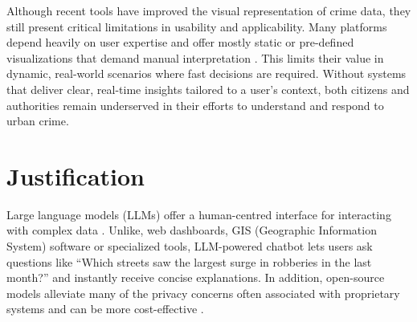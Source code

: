 Although recent tools have improved the visual representation of crime data, they still present critical limitations in usability and applicability. Many platforms depend heavily on user expertise and offer mostly static or pre-defined visualizations that demand manual interpretation \citep{Garcia2022CriPAV}. This limits their value in dynamic, real-world scenarios where fast decisions are required. Without systems that deliver clear, real-time insights tailored to a user's context, both citizens and authorities remain underserved in their efforts to understand and respond to urban crime.




\section{Justification}



Large language models (LLMs) offer a human-centred interface for interacting with complex data \citep{Yang2024HumanAIInteraction, Pappula2023LLMsFC}. Unlike, web dashboards, GIS (Geographic Information System) software or specialized tools, LLM-powered chatbot lets users ask questions like ``Which streets saw the largest surge in robberies in the last month?'' and instantly receive concise explanations. In addition, open-source models alleviate many of the privacy concerns \citep{Temsah2025DeepSeek, Ersoz2025CrimePredictionXAISurvey} often associated with proprietary systems and can be more cost-effective \citep{Liu2024NLDriven}. 

